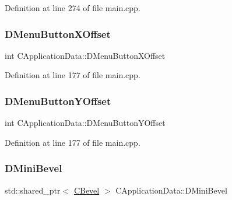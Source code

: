 Definition at line 274 of file main.\+cpp.

\hypertarget{classCApplicationData_a04283b17a8c04af8325de4304a848095}{}\label{classCApplicationData_a04283b17a8c04af8325de4304a848095} 
\subsubsection{\texorpdfstring{D\+Menu\+Button\+X\+Offset}{DMenuButtonXOffset}}
{\footnotesize\ttfamily int C\+Application\+Data\+::\+D\+Menu\+Button\+X\+Offset\hspace{0.3cm}{\ttfamily [protected]}}



Definition at line 177 of file main.\+cpp.

\hypertarget{classCApplicationData_a63012360d0a98eef89707a503f4379a8}{}\label{classCApplicationData_a63012360d0a98eef89707a503f4379a8} 
\subsubsection{\texorpdfstring{D\+Menu\+Button\+Y\+Offset}{DMenuButtonYOffset}}
{\footnotesize\ttfamily int C\+Application\+Data\+::\+D\+Menu\+Button\+Y\+Offset\hspace{0.3cm}{\ttfamily [protected]}}



Definition at line 177 of file main.\+cpp.

\hypertarget{classCApplicationData_ad6718b216878d9fe05b26cd24b89c6ee}{}\label{classCApplicationData_ad6718b216878d9fe05b26cd24b89c6ee} 
\subsubsection{\texorpdfstring{D\+Mini\+Bevel}{DMiniBevel}}
{\footnotesize\ttfamily std\+::shared\+\_\+ptr$<$ \hyperlink{classCBevel}{C\+Bevel} $>$ C\+Application\+Data\+::\+D\+Mini\+Bevel\hspace{0.3cm}{\ttfamily [protected]}}



